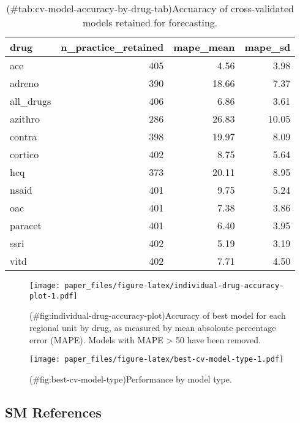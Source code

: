 \begin{appendix}
\begin{table}

\caption{(\#tab:cv-model-accuracy-by-drug-tab)Accuaracy of cross-validated models retained for forecasting.}
\centering
\begin{tabular}[t]{l|r|r|r}
\hline
drug & n\_practice\_retained & mape\_mean & mape\_sd\\
\hline
ace & 405 & 4.56 & 3.98\\
\hline
adreno & 390 & 18.66 & 7.37\\
\hline
all\_drugs & 406 & 6.86 & 3.61\\
\hline
azithro & 286 & 26.83 & 10.05\\
\hline
contra & 398 & 19.97 & 8.09\\
\hline
cortico & 402 & 8.75 & 5.64\\
\hline
hcq & 373 & 20.11 & 8.95\\
\hline
nsaid & 401 & 9.75 & 5.24\\
\hline
oac & 401 & 7.38 & 3.86\\
\hline
paracet & 401 & 6.40 & 3.95\\
\hline
ssri & 402 & 5.19 & 3.19\\
\hline
vitd & 402 & 7.71 & 4.50\\
\hline
\end{tabular}
\end{table}

\begin{figure}
\centering
\texttt{[image: paper\_files/figure-latex/individual-drug-accuracy-plot-1.pdf]}
\caption{(\#fig:individual-drug-accuracy-plot)Accuracy of best model for
each regional unit by drug, as measured by mean absoloute percentage
error (MAPE). Models with MAPE \textgreater{} 50 have been removed.}
\end{figure}

\begin{figure}
\centering
\texttt{[image: paper\_files/figure-latex/best-cv-model-type-1.pdf]}
\caption{(\#fig:best-cv-model-type)Performance by model type.}
\end{figure}

\newpage

\hypertarget{sm-references}{%
\subsection{SM References}\label{sm-references}}

\begingroup
\setlength{\parindent}{-0.5in}
\setlength{\leftskip}{0.5in}


\end{appendix}
